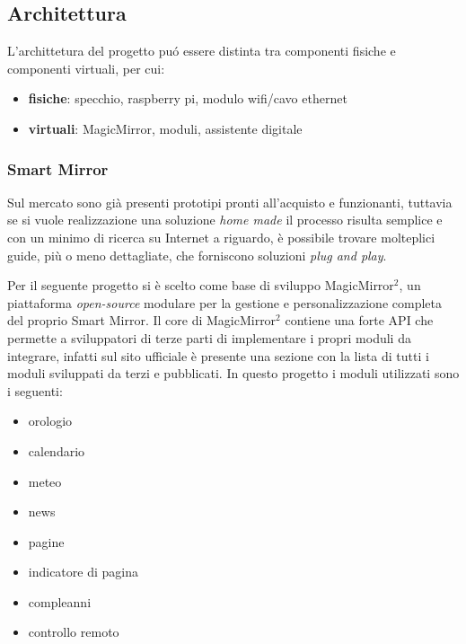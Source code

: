 \documentclass[12pt,a4paper]{article}
\begin{document}
\subsection{Architettura}

L'archittetura del progetto pu\'o essere distinta tra componenti fisiche e componenti virtuali, per cui:

\begin{itemize}
  \item \textbf{fisiche}: specchio, raspberry pi, modulo wifi/cavo ethernet
  \item \textbf{virtuali}: MagicMirror, moduli, assistente digitale
\end{itemize}

\subsubsection{Smart Mirror}

Sul mercato sono gi\`a presenti prototipi pronti all'acquisto e funzionanti, tuttavia se si vuole realizzazione
una soluzione \textit{home made} il processo risulta semplice e con un minimo di ricerca su Internet a riguardo,
\`e possibile trovare molteplici guide, pi\`u o meno dettagliate, che forniscono soluzioni \textit{plug and play}.

Per il seguente progetto si \`e scelto come base di sviluppo MagicMirror$^2$\cite{MagicMirrorRepo}, un piattaforma
\textit{open-source} modulare per la gestione e personalizzazione completa del proprio Smart Mirror. Il core di 
MagicMirror$^2$ contiene una forte API che permette a sviluppatori di terze parti di implementare i propri moduli
da integrare, infatti sul sito ufficiale\cite{MagicMirrorSite} \`e presente una sezione con la lista di tutti i
moduli sviluppati da terzi e pubblicati\cite{MagicMirrorModules}. In questo progetto i moduli utilizzati sono i seguenti:

\begin{itemize}
  \item orologio
  \item calendario
  \item meteo
  \item news
  \item pagine
  \item indicatore di pagina
  \item compleanni
  \item controllo remoto
\end{itemize}
\end{document}
